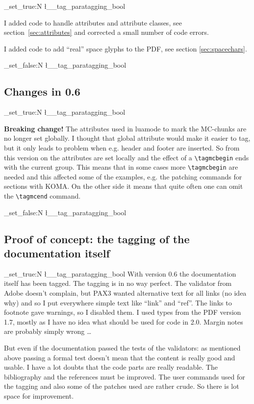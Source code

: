 \documentclass[DIV=12,parskip=half-,bibliography=totoc]{scrartcl}
\newcommand\PDF{PDF}
\newcommand\parataggingON {\bool_set_true:N \l__tag_paratagging_bool}
\newcommand\parataggingOff{\bool_set_false:N \l__tag_paratagging_bool}
\begin{document}
\parataggingON

I added code to handle attributes and attribute classes, see section~\ref{sec:attributes} and corrected a small number of code errors.

I added code to add \enquote{real} space glyphs to the \PDF{}, see section \ref{sec:spacechars}.

\parataggingOff

\subsection{Changes in 0.6}

\parataggingON

\textbf{Breaking change!} The attributes used in luamode to mark the MC-chunks are no longer set globally. I thought that global attribute would make it easier to tag, but it only leads to problem when e.g. header and footer are inserted. So from this version on the attributes are set locally and the effect of a \verb+\tagmcbegin+ ends with the current group. This means that in some cases more \verb+\tagmcbegin+ are needed and  this affected some of the examples, e.g. the patching commands for sections with KOMA. On the other side it means that quite often one can omit the \verb+\tagmcend+ command.

\parataggingOff


\subsection{Proof of concept: the tagging of the documentation itself}

\parataggingON
With version 0.6 the documentation itself has been tagged. The tagging is in no way perfect. The validator from Adobe doesn't complain, but PAX3 wanted alternative text for all links (no idea why) and so I put everywhere simple text like \enquote{link} and \enquote{ref}. The links to footnote gave warnings, so I disabled them. I used types from the \PDF{} version 1.7, mostly as I have no idea what should be used for code in 2.0. Margin notes are probably simply wrong \ldots

But even if the documentation passed the tests of the validators:  as mentioned above passing a formal test doesn't mean that the content is really good and usable. I have a lot doubts that the code parts are really readable. The bibliography and the references must be improved. The user commands used for the tagging and also some of the patches used are rather crude. So there is lot space for improvement.
\end{document}
